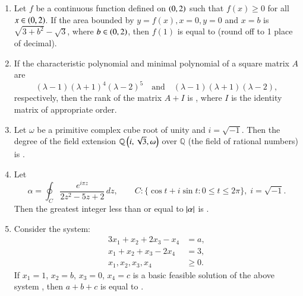 \documentclass[journal,12pt,onecolumn]{IEEEtran}
\theoremstyle{remark}
\begin{document}
\begin{enumerate}[start=1, label=Q.\arabic*]
\hfill{}


\item Let $f$ be a continuous function defined on $\left(0,2\right)$ such that $f(x) \ge 0$ for all $x \in \left(0,2\right)$. If the area bounded by $y=f(x), x=0, y=0$ and $x=b$ is $\sqrt{3+b^2} - \sqrt{3}$, where $b \in \left(0,2\right)$, then $f(1)$ is equal to \underline{\hspace{2cm}} (round off to 1 place of decimal).  

\hfill{}


\item If the characteristic polynomial and minimal polynomial of a square matrix $A$ are  
\[
(\lambda - 1)(\lambda + 1)^4(\lambda - 2)^5
\quad \text{and} \quad
(\lambda - 1)(\lambda + 1)(\lambda - 2),
\]
respectively, then the rank of the matrix $A+I$ is \underline{\hspace{2cm}}, where $I$ is the identity matrix of appropriate order.  

\hfill{}


\item Let $\omega$ be a primitive complex cube root of unity and $i=\sqrt{-1}$. Then the degree of the field extension $\mathbb{Q}\left(i, \sqrt{3}, \omega\right)$ over $\mathbb{Q}$ (the field of rational numbers) is \underline{\hspace{2cm}}.  

\hfill{}

\item Let
\[
\alpha = \oint_{C} \frac{e^{i\pi z}}{2z^2 - 5z + 2}\,dz, 
\qquad
C : \{\cos t + i \sin t : 0 \le t \le 2\pi\}, \; i=\sqrt{-1}.
\]
Then the greatest integer less than or equal to $\left\vert\alpha\right\vert$ is \underline{\hspace{2cm}}.

\hfill{}


\item Consider the system:
\[
\begin{aligned}
3x_1 + x_2 + 2x_3 - x_4 &= a,\\
x_1 + x_2 + x_3 - 2x_4 &= 3,\\
x_1, x_2, x_3, x_4 &\ge 0.
\end{aligned}
\]
If $x_1=1$, $x_2=b$, $x_3=0$, $x_4=c$ is a basic feasible solution of the above system , then $a+b+c$ is equal to \underline{\hspace{2cm}}.


\end{enumerate}
\end{document}
